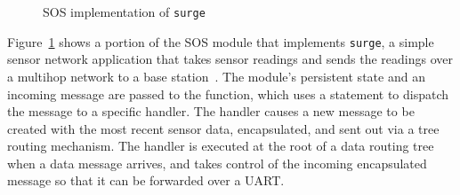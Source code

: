 \begin{figure}[t]

\caption{SOS implementation of {\tt surge}\label{fig:surge}}
\end{figure}

Figure~\ref{fig:surge} shows a portion of the SOS module that
implements {\tt surge}, a simple sensor network application that takes
sensor readings and sends the readings over a multihop network to a
base station~\cite{nesC}.  The module's persistent state and an
incoming message are passed to the  function,
which uses a  statement to dispatch the message to a
specific handler.  The  handler causes a new
message to be created with the most recent sensor data, encapsulated,
and sent out via a tree routing mechanism.  The
 handler is executed at the root of a data
routing tree when a data message arrives, and takes control of the
incoming encapsulated message so that it can be forwarded over a UART.


% 
% 

